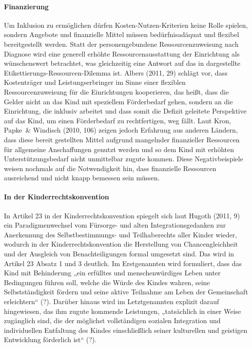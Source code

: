 \paragraph{Finanzierung}
Um Inklusion zu ermöglichen dürfen Kosten-Nutzen-Kriterien keine Rolle spielen, sondern Angebote und finanzielle Mittel müssen bedürfnisadäquat und flexibel bereitgestellt werden. Statt der personengebundene Ressourcenzuweisung nach Diagnose wird eine generell erhöhte Ressourcenausstattung der Einrichtung als wünschenswert betrachtet, was gleichzeitig eine Antwort auf das in dargestellte Etikettierungs-Ressourcen-Dilemma ist. 
Albers (2011, 29) schlägt vor, dass Kostenträger und Leistungserbringer im Sinne einer flexiblen Ressourcenzuweisung für die Einrichtungen kooperieren, das heißt, dass die Gelder nicht an das Kind mit speziellem Förderbedarf gehen, sondern an die Einrichtung, die inklusiv arbeitet und dass somit die Defizit geleitete Perspektive auf das Kind, um einen Förderbedarf zu rechtfertigen, weg fällt. Laut Kron, Papke~\& Windisch (2010, 106) zeigen jedoch Erfahrung aus anderen Ländern, dass diese bereit gestellten Mittel aufgrund mangelnder finanzieller Ressourcen für allgemeine Anschaffungen genutzt werden und so dem Kind mit erhöhten Unterstützungsbedarf nicht unmittelbar zugute kommen. Diese Negativbeispiele weisen nochmals auf die Notwendigkeit hin, dass  finanzielle Ressourcen ausreichend und nicht knapp bemessen sein müssen. 

\paragraph{In der Kinderrechtskonvention}
In Artikel 23 in der Kinderrechtskonvention spiegelt sich laut Hugoth (2011, 9) ein Paradigmenwechsel vom Fürsorge- und alten Integrationsgedanken zur Anerkennung des Selbstbestimmungs- und Teilhaberechts aller Kinder wieder, wodurch in der Kinderrechtskonvention die Herstellung von Chancengleichheit und der Ausgleich von Benachteiligungen formal umgesetzt sind. Das wird in Artikel 23 Absatz 1 und 3 deutlich. Im Erstgenannten wird formuliert, dass das Kind mit Behinderung „ein erfülltes und menschenwürdiges Leben unter Bedingungen führen soll, welche die Würde des Kindes wahren, seine Selbstständigkeit fördern und seine aktive Teilnahme am Leben der Gemeinschaft erleichtern“ (?). Darüber hinaus wird im Letztgenannten explizit darauf hingewiesen, das ihm zugute kommende Leistungen, „tatsächlich in einer Weise zugänglich sind, die der möglichst vollständigen sozialen Integration und individuellen Entfaltung des Kindes einschließlich seiner kulturellen und geistigen Entwicklung förderlich ist“ (?). 

